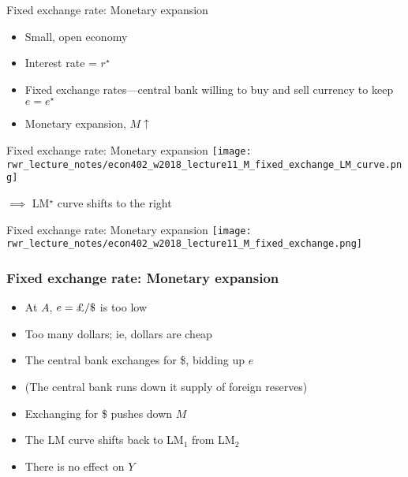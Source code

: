 \documentclass[presentation,dvipsnames]{beamer}
\renewcommand{\pounds}{\text{\textsterling}{ }}
\begin{document}

\begin{frame}[label=sec-6-2]{Fixed exchange rate: Monetary expansion}
\begin{itemize}[label={--}]
\item Small, open economy
\item Interest rate = $r^{\star}$
\item Fixed exchange rates---central bank willing to buy and sell currency to keep $e = e^{\star}$
\item Monetary expansion, $M \uparrow$
\end{itemize}
\end{frame}
\begin{frame}[label=sec-6-2]{Fixed exchange rate: Monetary expansion}
\texttt{[image: rwr\_lecture\_notes/econ402\_w2018\_lecture11\_M\_fixed\_exchange\_LM\_curve.png]}

$\implies$ LM$^{\star}$ curve shifts to the right

\end{frame}
\begin{frame}[label=sec-6-2]{Fixed exchange rate: Monetary expansion}
\texttt{[image: rwr\_lecture\_notes/econ402\_w2018\_lecture11\_M\_fixed\_exchange.png]}
\end{frame}
\begin{frame}
\frametitle{Fixed exchange rate: Monetary expansion}
\begin{itemize}[label={--}]
\item At $A$, $e = \pounds / \$ $ is too low
\item Too many dollars; ie, dollars are cheap
\item The central bank exchanges \pounds for \$, bidding up $e$
\item (The central bank runs down it supply of foreign reserves)
\item Exchanging \pounds for \$ pushes down $M$
\item The LM curve shifts back to LM$_{1}$ from LM$_{2}$
\item \textcolor{RubineRed}{There is no effect on $Y$}
\end{itemize}
\end{frame}
\end{document}
